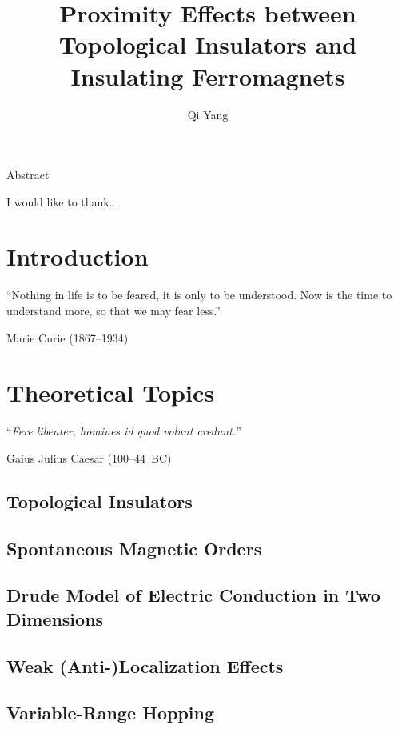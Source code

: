﻿\documentclass{report}
\begin{document}
\title{Proximity Effects between Topological Insulators and Insulating Ferromagnets}
\author{Qi Yang}

\keepXColumns

\beforepreface
%

    Abstract 


    I would like to thank...
\afterpreface

\captionsetup{width=0.95\columnwidth}%
\chapter{Introduction}\label{ch:intro}
\epigraph{``Nothing in life is to be feared, it is only to be understood. Now is the time to understand more, so that we may fear less.''}{Marie Curie (1867--1934)}
    

\chapter{Theoretical Topics}\label{ch:theory}
\begin{refsection} 
\epigraph{``\textit{Fere libenter, homines id quod volunt credunt.}''}{Gaius Julius Caesar (100--44~BC)}
    \section{Topological Insulators}\label{sec:ti}
        
    \section{Spontaneous Magnetic Orders}\label{sec:magnetism}
        
    \section{Drude Model of Electric Conduction in Two Dimensions}\label{sec:drude}
        
    \section{Weak (Anti-)Localization Effects}\label{sec:wl}
        
    \section{Variable-Range Hopping}\label{sec:vrh}
        
    \printbibliography[heading=subbibintoc, title=References for Chapter~\thechapter]
\end{refsection}	
\end{document}
